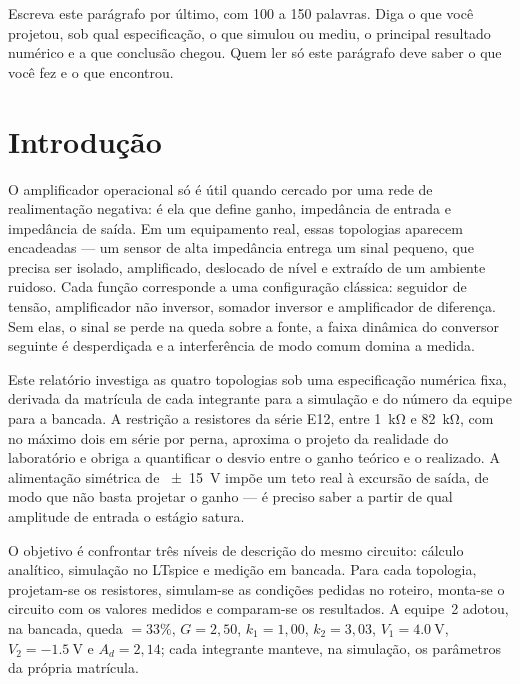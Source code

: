 \documentclass[11pt,a4paper]{article}
\begin{document}
\capa

\begin{resumo}
Escreva este parágrafo por último, com 100 a 150 palavras. Diga o que você projetou, sob
qual especificação, o que simulou ou mediu, o principal resultado numérico e a que
conclusão chegou. Quem ler só este parágrafo deve saber o que você fez e o que encontrou.
\end{resumo}

\section{Introdução}

O amplificador operacional só é útil quando cercado por uma rede de realimentação negativa: é ela que define ganho, impedância de entrada e impedância de saída. Em um equipamento real, essas topologias aparecem encadeadas — um sensor de alta impedância entrega um sinal pequeno, que precisa ser isolado, amplificado, deslocado de nível e extraído de um ambiente ruidoso. Cada função corresponde a uma configuração clássica: seguidor de tensão, amplificador não inversor, somador inversor e amplificador de diferença. Sem elas, o sinal se perde na queda sobre a fonte, a faixa dinâmica do conversor seguinte é desperdiçada e a interferência de modo comum domina a medida.

Este relatório investiga as quatro topologias sob uma especificação numérica fixa, derivada da matrícula de cada integrante para a simulação e do número da equipe para a bancada. A restrição a resistores da série E12, entre \SI{1}{\kilo\ohm} e \SI{82}{\kilo\ohm}, com no máximo dois em série por perna, aproxima o projeto da realidade do laboratório e obriga a quantificar o desvio entre o ganho teórico e o realizado. A alimentação simétrica de \SI{\pm 15}{\volt} impõe um teto real à excursão de saída, de modo que não basta projetar o ganho — é preciso saber a partir de qual amplitude de entrada o estágio satura.

O objetivo é confrontar três níveis de descrição do mesmo circuito: cálculo analítico, simulação no LTspice e medição em bancada. Para cada topologia, projetam-se os resistores, simulam-se as condições pedidas no roteiro, monta-se o circuito com os valores medidos e comparam-se os resultados. A equipe~2 adotou, na bancada, queda $= 33\%$, $G = 2{,}50$, $k_1 = 1{,}00$, $k_2 = 3{,}03$, $V_1 = \SI{4,0}{\volt}$, $V_2 = \SI{-1,5}{\volt}$ e $A_d = 2{,}14$; cada integrante manteve, na simulação, os parâmetros da própria matrícula.
\end{document}
